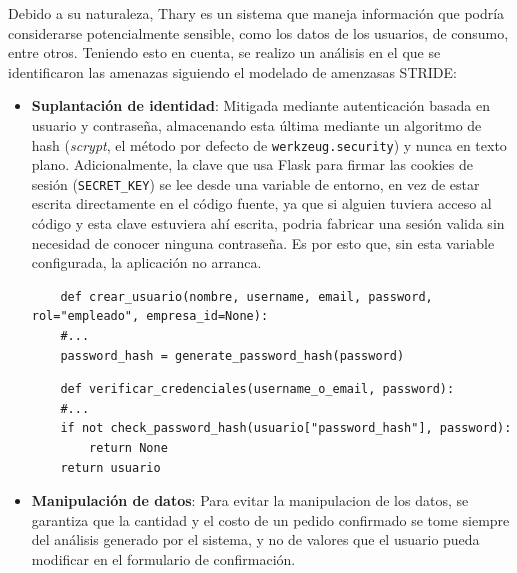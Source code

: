 Debido a su naturaleza, Thary es un sistema que maneja información que podría considerarse potencialmente sensible, como los datos de los usuarios, de consumo, entre otros. Teniendo esto en cuenta, se realizo un análisis en el que se identificaron las amenazas siguiendo el modelado de amenzasas STRIDE:

\begin{itemize}
    \item \textbf{Suplantación de identidad}: Mitigada mediante autenticación basada en usuario y contraseña, almacenando esta última mediante un algoritmo de hash (\textit{scrypt}, el método por defecto de \texttt{werkzeug.security}) y nunca en texto plano. Adicionalmente, la clave que usa Flask para firmar las cookies de sesión (\texttt{SECRET\_KEY}) se lee desde una variable de entorno, en vez de estar escrita directamente en el código fuente, ya que si alguien tuviera acceso al código y esta clave estuviera ahí escrita, podria fabricar una sesión valida sin necesidad de conocer ninguna contraseña. Es por esto que, sin esta variable configurada, la aplicación no arranca.
    
    \label{lst:crear_usuario}
    \begin{verbatim}
    def crear_usuario(nombre, username, email, password, rol="empleado", empresa_id=None):
    #...
    password_hash = generate_password_hash(password)
    \end{verbatim}

    \label{lst:verificar_credenciales}
    \begin{verbatim}
    def verificar_credenciales(username_o_email, password):
    #...
    if not check_password_hash(usuario["password_hash"], password):
        return None
    return usuario
    \end{verbatim}

    \item \textbf{Manipulación de datos}: Para evitar la manipulacion de los datos, se garantiza que la cantidad y el costo de un pedido confirmado se tome siempre del análisis generado por el sistema, y no de valores que el usuario pueda modificar en el formulario de confirmación.
    

\end{itemize}
